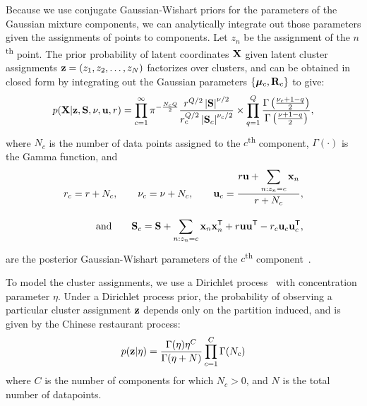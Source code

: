 Because we use conjugate Gaussian-Wishart priors for the parameters of the Gaussian mixture components, we can analytically integrate out those parameters given the assignments of points to components.
Let $z_n$ be the assignment of the $n$\textsuperscript{th} point.
The prior probability of latent coordinates $\mathbf{X}$ given latent cluster assignments ${\bf{z}}=(z_1, z_2, \ldots, z_N)$ factorizes over clusters, and can be obtained in closed form by integrating out the Gaussian parameters $\{{\boldsymbol{\mu}}_c, \mathbf{R}_c\}$ to give:
%
\begin{align}
p(\mathbf{X} | {\bf{z}}, \mathbf{S}, \nu, {\bf{u}}, r) = \prod_{c=1}^{\infty}
\pi^{-\frac{N_c Q}{2}}\frac{r^{Q/2} \left|\mathbf{S} \right|^{\nu/2}}{r_c^{Q/2} \left| \mathbf{S}_c \right|^{\nu_c/2}}
\times \prod_{q=1}^Q \frac{\Gamma \left( \frac{\nu_c + 1 - q}{2} \right)}{\Gamma \left( \frac{\nu+1-q}{2} \right)},
\label{eq:px_z}
\end{align}
%
where $N_c$ is the number of data points assigned to the $c$\textsuperscript{th} component, $\Gamma(\cdot)$ is the Gamma function, and
%
\begin{align}
r_{c}=r+N_{c},
\hspace{2em}
\nu_{c}=\nu+N_{c}, 
\hspace{2em}
\vu_c=\frac{\displaystyle r\vu + \sum_{n:z_n = c} \vx_n}{r+N_c}, \\[1em]
%
\textnormal{and} \hspace{2em} \vS_{c}=\vS+\sum_{n:z_{n}=c}\vx_{n}\vx_{n}\tra + r\vu\vu\tra
 - r_{c}\vu_{c}\vu_{c}\tra,
\end{align}
%
are the posterior Gaussian-Wishart parameters of the $c$\textsuperscript{th} component~\citep{murphy2007conjugate}.

To model the cluster assignments, we use a Dirichlet process~\citep{maceachern1998estimating} with concentration parameter $\eta$.
Under a Dirichlet process prior, the probability of observing a particular cluster assignment ${\bf{z}}$ depends only on the partition induced, and is given by the Chinese restaurant process:
%
\begin{align}
p({\bf{z}}|\eta) = 
\frac{\Gamma(\eta) \eta^C}{\Gamma(\eta + N)} \prod_{c=1}^C \Gamma( N_c )
\label{eq:pz}
\end{align}
%
where $C$ is the number of components for which $N_c > 0$, and $N$ is the total number of datapoints.

